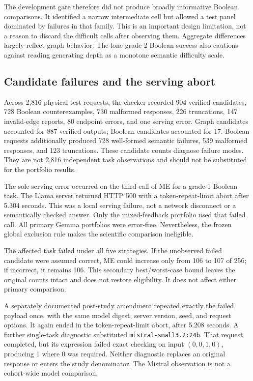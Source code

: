 The development gate therefore did not produce broadly informative Boolean comparisons. It identified a narrow intermediate cell but allowed a test panel dominated by failures in that family. This is an important design limitation, not a reason to discard the difficult cells after observing them. Aggregate differences largely reflect graph behavior. The lone grade-2 Boolean success also cautions against reading generating depth as a monotone semantic difficulty scale.

\subsection{Candidate failures and the serving abort}

Across 2,816 physical test requests, the checker recorded 904 verified candidates, 728 Boolean counterexamples, 730 malformed responses, 226 truncations, 147 invalid-edge reports, 80 endpoint errors, and one serving error. Graph candidates accounted for 887 verified outputs; Boolean candidates accounted for 17. Boolean requests additionally produced 728 well-formed semantic failures, 539 malformed responses, and 123 truncations. These candidate counts diagnose failure modes. They are not 2,816 independent task observations and should not be substituted for the portfolio results.

The sole serving error occurred on the third call of ME for a grade-1 Boolean task. The Llama server returned HTTP 500 with a token-repeat-limit abort after 5.304 seconds. This was a local serving failure, not a network disconnect or a semantically checked answer. Only the mixed-feedback portfolio used that failed call. All primary Gemma portfolios were error-free. Nevertheless, the frozen global exclusion rule makes the scientific comparison ineligible.

The affected task failed under all five strategies. If the unobserved failed candidate were assumed correct, ME could increase only from 106 to 107 of 256; if incorrect, it remains 106. This secondary best/worst-case bound leaves the original counts intact and does not restore eligibility. It does not affect either primary comparison.

A separately documented post-study amendment repeated exactly the failed payload once, with the same model digest, server version, seed, and request options. It again ended in the token-repeat-limit abort, after 5.208 seconds. A further single-task diagnostic substituted \texttt{mistral-small3.2:24b}. That request completed, but its expression failed exact checking on input $(0,0,1,0)$, producing 1 where 0 was required. Neither diagnostic replaces an original response or enters the study denominator. The Mistral observation is not a cohort-wide model comparison.

